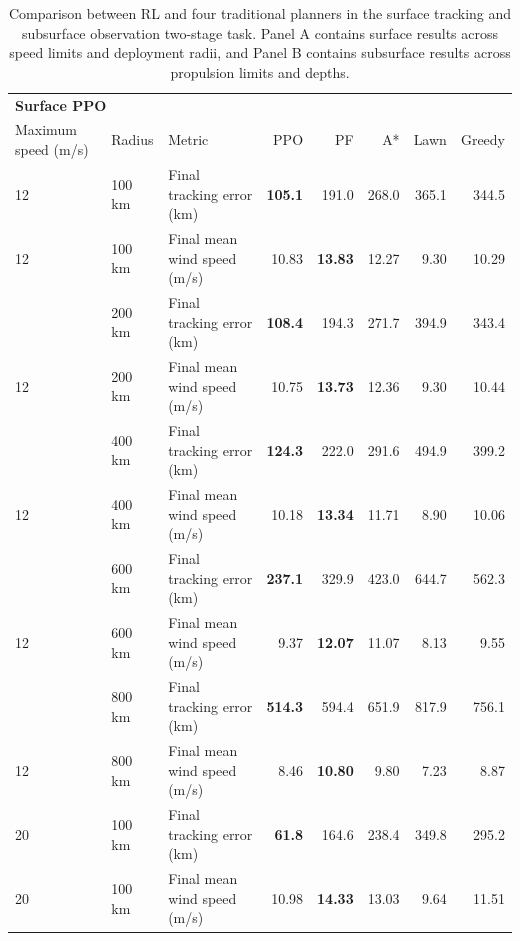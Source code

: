 \documentclass[a4paper,fleqn]{cas-dc}
\begin{document}
\footnotesize
\renewcommand{\arraystretch}{0.82}
\begin{table}[p]
\centering
\caption{Comparison between RL and four traditional planners in the surface tracking and subsurface observation two-stage task. Panel A contains surface results across speed limits and deployment radii, and Panel B contains subsurface results across propulsion limits and depths.}
\label{tab:planner_stratified}
\footnotesize
\setlength{\tabcolsep}{3pt}
\renewcommand{\arraystretch}{0.82}
\begin{tabularx}{\textwidth}{@{}l@{\hspace{0.8em}}lXrrrrr@{}}
\toprule
\multicolumn{8}{l}{\textbf{Surface PPO}}\\
Maximum speed (m/s) & Radius & Metric & PPO & PF & A* & Lawn & Greedy \\
\midrule
12 & 100 km & Final tracking error (km) & \textbf{105.1} & 191.0 & 268.0 & 365.1 & 344.5 \\
12 & 100 km & Final mean wind speed (m/s) & 10.83 & \textbf{13.83} & 12.27 & 9.30 & 10.29 \\
\addlinespace[1.0pt]
12 & 200 km & Final tracking error (km) & \textbf{108.4} & 194.3 & 271.7 & 394.9 & 343.4 \\
12 & 200 km & Final mean wind speed (m/s) & 10.75 & \textbf{13.73} & 12.36 & 9.30 & 10.44 \\
\addlinespace[1.0pt]
12 & 400 km & Final tracking error (km) & \textbf{124.3} & 222.0 & 291.6 & 494.9 & 399.2 \\
12 & 400 km & Final mean wind speed (m/s) & 10.18 & \textbf{13.34} & 11.71 & 8.90 & 10.06 \\
\addlinespace[1.0pt]
12 & 600 km & Final tracking error (km) & \textbf{237.1} & 329.9 & 423.0 & 644.7 & 562.3 \\
12 & 600 km & Final mean wind speed (m/s) & 9.37 & \textbf{12.07} & 11.07 & 8.13 & 9.55 \\
\addlinespace[1.0pt]
12 & 800 km & Final tracking error (km) & \textbf{514.3} & 594.4 & 651.9 & 817.9 & 756.1 \\
12 & 800 km & Final mean wind speed (m/s) & 8.46 & \textbf{10.80} & 9.80 & 7.23 & 8.87 \\
20 & 100 km & Final tracking error (km) & \textbf{61.8} & 164.6 & 238.4 & 349.8 & 295.2 \\
20 & 100 km & Final mean wind speed (m/s) & 10.98 & \textbf{14.33} & 13.03 & 9.64 & 11.51 \\

\end{tabularx}
\end{table}
\end{document}
